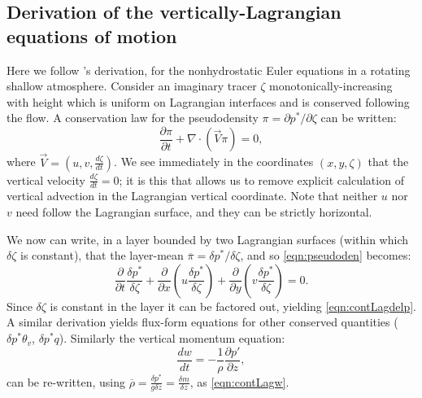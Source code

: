 \documentclass[10pt,letterpaper,margin=1in]{memoir}
\begin{document}
\begin{subappendices}


\section{Derivation of the vertically-Lagrangian equations of motion} \label{sec:derivLag}

Here we follow \citet{L04}'s derivation, for the nonhydrostatic Euler equations in a rotating shallow atmosphere. Consider an imaginary tracer $\zeta$ monotonically-increasing with height which is uniform on Lagrangian interfaces and is conserved following the flow. A conservation law for the pseudodensity $\pi = \partial p^*/\partial \zeta$ can be written:
\begin{equation}
\frac{\partial \pi}{\partial t} + \nabla \cdot \left ( \vec{V} \pi \right ) = 0, \label{eqn:pseudoden}
\end{equation}
where $\vec{V} = \left ( u, v, \frac{d\zeta}{dt} \right )$. We see immediately in the coordinates $\left (x, y, \zeta \right)$ that the vertical velocity $\frac{d\zeta}{dt}  = 0$; it is this that allows us to remove explicit calculation of vertical advection in the Lagrangian vertical coordinate. Note that neither $u$ nor $v$ need follow the Lagrangian surface, and they can be strictly horizontal.

We now can write, in a layer bounded by two Lagrangian surfaces (within which $\delta \zeta$ is constant), that the layer-mean $\overline{\pi} = \delta p^*/\delta \zeta$, and so \eqref{eqn:pseudoden} becomes:
\begin{equation}
\frac{\partial}{\partial t} \frac{\delta p^*}{\delta \zeta} + \frac{\partial }{\partial x} \left ( u \frac{\delta p^*}{\delta \zeta} \right ) + \frac{\partial }{\partial y} \left ( v \frac{\delta p^*}{\delta \zeta} \right ) = 0.
\end{equation}
Since $\delta \zeta$ is constant in the layer it can be factored out, yielding \eqref{eqn:contLagdelp}. A similar derivation yields flux-form equations for other conserved quantities ($\delta p^* \theta_v$, $\delta p^* q$). Similarly the vertical momentum equation:
\begin{equation}
\frac{dw}{dt} = -\frac{1}{\rho} \frac{\partial p'}{\partial z},
\end{equation}
can be re-written, using $\overline{\rho} = \frac{\delta p^*}{g \delta z} = \frac{\delta m}{\delta z}$, as \eqref{eqn:contLagw}. 


\end{subappendices}
\end{document}
